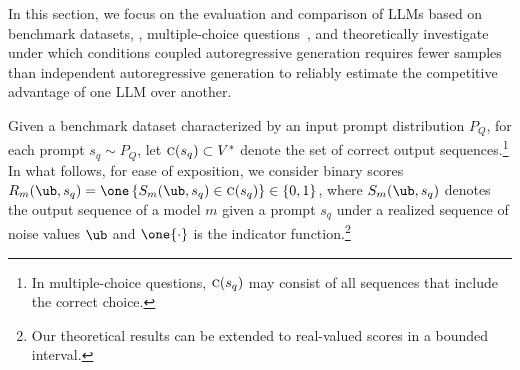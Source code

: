In this section, we focus on the evaluation and comparison of LLMs based on benchmark datasets, \eg, multiple-choice questions~\citep{hendrycks2021measuring}, and theoretically investigate under which conditions coupled autoregressive generation requires fewer samples than independent autoregressive generation to reliably estimate the competitive advantage of one LLM over another.

Given a benchmark dataset characterized by an input prompt distribution $P_Q$, for each prompt $s_q \sim P_Q$,
%
let $\textsc{c}(s_q) \subset V^*$ denote the set of correct output sequences.\footnote{In multiple-choice questions, $\textsc{c}(s_q)$ may consist of all sequences that include the correct choice.} %
In what follows, for ease of exposition, we consider binary scores
%
    $R_m(\ub, s_q) = \one\left\{S_m(\ub, s_q) \in \textsc{c}(s_q)\right\} \in \{0, 1\}$,
%
where $S_m(\ub, s_q)$ denotes the output sequence of a model $m$ given a prompt $s_q$ under a realized sequence of noise values $\ub$ and $\one\{\cdot\}$ is the indicator function.\footnote{Our theoretical results can be extended to real-valued scores in a bounded interval.}

